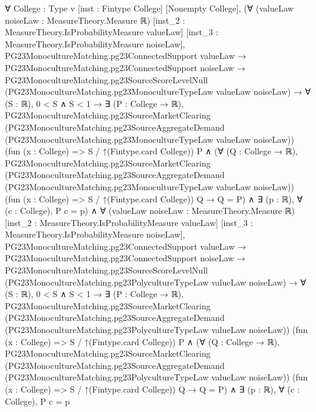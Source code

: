 \documentclass[10pt]{article}
\begin{document}
\begin{ReviewVerbatim}
∀ {College : Type v} [inst : Fintype College] [Nonempty College],
  (∀ (valueLaw noiseLaw : MeasureTheory.Measure ℝ) [inst_2 : MeasureTheory.IsProbabilityMeasure valueLaw]
      [inst_3 : MeasureTheory.IsProbabilityMeasure noiseLaw],
      PG23MonocultureMatching.pg23ConnectedSupport valueLaw →
        PG23MonocultureMatching.pg23ConnectedSupport noiseLaw →
          PG23MonocultureMatching.pg23SourceScoreLevelNull
              (PG23MonocultureMatching.pg23MonocultureTypeLaw valueLaw noiseLaw) →
            ∀ (S : ℝ),
              0 < S ∧ S < 1 →
                ∃ (P : College → ℝ),
                  PG23MonocultureMatching.pg23SourceMarketClearing
                      (PG23MonocultureMatching.pg23SourceAggregateDemand
                        (PG23MonocultureMatching.pg23MonocultureTypeLaw valueLaw noiseLaw))
                      (fun (x : College) => S / ↑(Fintype.card College)) P ∧
                    (∀ (Q : College → ℝ),
                        PG23MonocultureMatching.pg23SourceMarketClearing
                            (PG23MonocultureMatching.pg23SourceAggregateDemand
                              (PG23MonocultureMatching.pg23MonocultureTypeLaw valueLaw noiseLaw))
                            (fun (x : College) => S / ↑(Fintype.card College)) Q →
                          Q = P) ∧
                      ∃ (p : ℝ), ∀ (c : College), P c = p) ∧
    ∀ (valueLaw noiseLaw : MeasureTheory.Measure ℝ) [inst_2 : MeasureTheory.IsProbabilityMeasure valueLaw]
      [inst_3 : MeasureTheory.IsProbabilityMeasure noiseLaw],
      PG23MonocultureMatching.pg23ConnectedSupport valueLaw →
        PG23MonocultureMatching.pg23ConnectedSupport noiseLaw →
          PG23MonocultureMatching.pg23SourceScoreLevelNull
              (PG23MonocultureMatching.pg23PolycultureTypeLaw valueLaw noiseLaw) →
            ∀ (S : ℝ),
              0 < S ∧ S < 1 →
                ∃ (P : College → ℝ),
                  PG23MonocultureMatching.pg23SourceMarketClearing
                      (PG23MonocultureMatching.pg23SourceAggregateDemand
                        (PG23MonocultureMatching.pg23PolycultureTypeLaw valueLaw noiseLaw))
                      (fun (x : College) => S / ↑(Fintype.card College)) P ∧
                    (∀ (Q : College → ℝ),
                        PG23MonocultureMatching.pg23SourceMarketClearing
                            (PG23MonocultureMatching.pg23SourceAggregateDemand
                              (PG23MonocultureMatching.pg23PolycultureTypeLaw valueLaw noiseLaw))
                            (fun (x : College) => S / ↑(Fintype.card College)) Q →
                          Q = P) ∧
                      ∃ (p : ℝ), ∀ (c : College), P c = p
\end{ReviewVerbatim}
\end{document}
